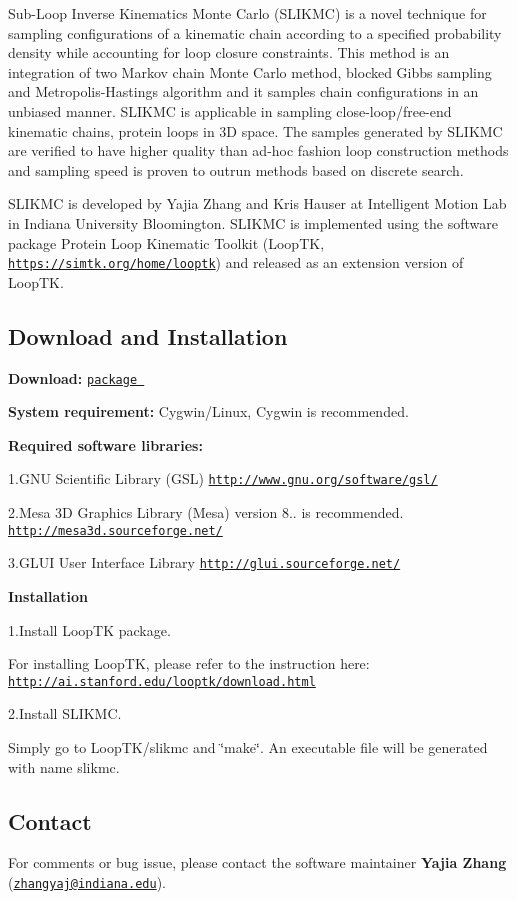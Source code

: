 Sub-\/\-Loop Inverse Kinematics Monte Carlo (S\-L\-I\-K\-M\-C) is a novel technique for sampling configurations of a kinematic chain according to a specified probability density while accounting for loop closure constraints. This method is an integration of two Markov chain Monte Carlo method, blocked Gibbs sampling and Metropolis-\/\-Hastings algorithm and it samples chain configurations in an unbiased manner. S\-L\-I\-K\-M\-C is applicable in sampling close-\/loop/free-\/end kinematic chains, protein loops in 3\-D space. The samples generated by S\-L\-I\-K\-M\-C are verified to have higher quality than ad-\/hoc fashion loop construction methods and sampling speed is proven to outrun methods based on discrete search.

S\-L\-I\-K\-M\-C is developed by Yajia Zhang and Kris Hauser at Intelligent Motion Lab in Indiana University Bloomington. S\-L\-I\-K\-M\-C is implemented using the software package Protein Loop Kinematic Toolkit (Loop\-T\-K, \href{https://simtk.org/home/looptk}{\tt https\-://simtk.\-org/home/looptk}) and released as an extension version of Loop\-T\-K.

\subsection*{Download and Installation }

{\bfseries Download\-:} \href{../LoopTK_release.zip}{\tt package }

{\bfseries System requirement\-:} Cygwin/\-Linux, Cygwin is recommended.

{\bfseries Required software libraries\-:}

1.\-G\-N\-U Scientific Library (G\-S\-L) \href{http://www.gnu.org/software/gsl/}{\tt http\-://www.\-gnu.\-org/software/gsl/}

2.\-Mesa 3\-D Graphics Library (Mesa) version 8.. is recommended. \href{http://mesa3d.sourceforge.net/}{\tt http\-://mesa3d.\-sourceforge.\-net/}

3.\-G\-L\-U\-I User Interface Library \href{http://glui.sourceforge.net/}{\tt http\-://glui.\-sourceforge.\-net/}

{\bfseries Installation}

1.\-Install Loop\-T\-K package.

For installing Loop\-T\-K, please refer to the instruction here\-: \href{http://ai.stanford.edu/looptk/download.html}{\tt http\-://ai.\-stanford.\-edu/looptk/download.\-html}

2.\-Install S\-L\-I\-K\-M\-C.

Simply go to Loop\-T\-K/slikmc and \char`\"{}make\char`\"{}. An executable file will be generated with name slikmc.

\subsection*{Contact }

For comments or bug issue, please contact the software maintainer {\bfseries Yajia Zhang} (\href{mailto:zhangyaj@indiana.edu}{\tt zhangyaj@indiana.\-edu}). 